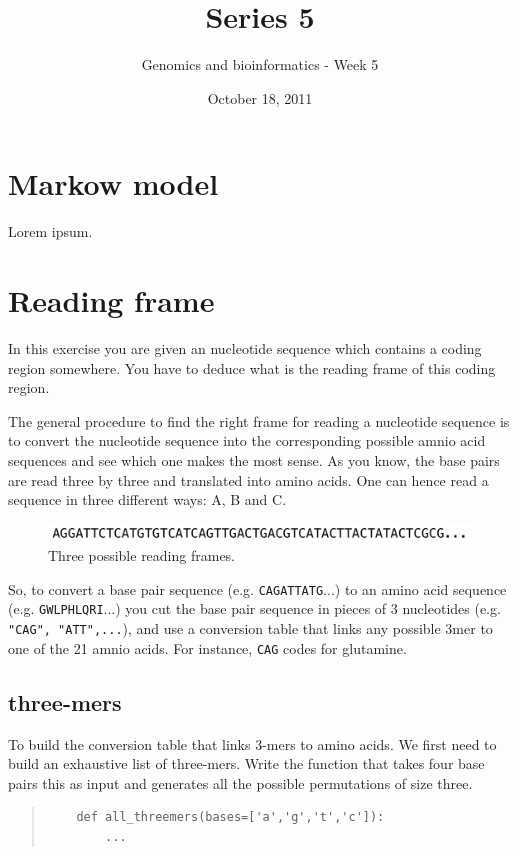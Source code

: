 \documentclass[a4paper,11pt]{article}
\title{Series 5}
\date{October 18, 2011}
\author{Genomics and bioinformatics - Week 5}
\begin{document}
\maketitle

\section{Markow model}
Lorem ipsum.

\section{Reading frame}
In this exercise you are given an nucleotide sequence which contains a coding region somewhere. You have to deduce what is the reading frame of this coding region.

The general procedure to find the right frame for reading a nucleotide sequence is to convert the nucleotide sequence into the corresponding possible amnio acid sequences and see which one makes the most sense. As you know, the base pairs are read three by three and translated into amino acids. One can hence read a sequence in three different ways: A, B and C.

\begin{figure}[h!]
	\centering
	\includegraphics[width=1.0\textwidth]{reading_frame.pdf}
	\caption{Three possible reading frames.}
	\label{fig:gene_distribution_rib}
\end{figure}

So, to convert a base pair sequence (e.g. \texttt{CAGATTATG}...) to an amino acid sequence (e.g. \texttt{GWLPHLQRI}...) you cut the base pair sequence in pieces of 3 nucleotides (e.g. \texttt{"CAG", "ATT",...}), and use a conversion table that links any possible 3mer to one of the 21 amnio acids. For instance, \texttt{CAG} codes for glutamine.

\subsection{three-mers}
To build the conversion table that links 3-mers to amino acids. We first need to build an exhaustive list of three-mers. Write the function that takes four base pairs this as input and generates all the possible permutations of size three.

\begin{quote}
\begin{verbatim}
	def all_threemers(bases=['a','g','t','c']):
		...
\end{verbatim}
\end{quote}
	
\end{document}
